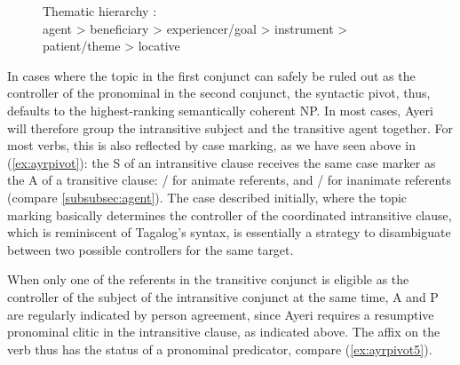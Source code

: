 \begin{figure}[h]
\ex\label{ex:themhier}%
	Thematic hierarchy \citep[329]{bresnan2016}:\medskip \\
	agent > beneficiary > experiencer/goal > instrument > patient/theme >
	locative
\xe
\end{figure}

In cases where the topic in the first conjunct can safely be ruled out as the
controller of the pronominal in the second conjunct, the syntactic pivot, thus,
defaults to the highest-ranking semantically coherent NP. In most cases,
Ayeri will therefore group the intransitive subject and the transitive agent
together. For most verbs, this is also reflected by case marking, as we have
seen above in (\ref{ex:ayrpivot}): the S of an intransitive clause receives the
same case marker as the A of a transitive clause:
/ for animate referents, and
/ for inanimate referents (compare
\autoref{subsubsec:agent}). The case described initially, where the topic
marking basically determines the controller of the coordinated intransitive
clause, which is reminiscent of Tagalog's syntax, is essentially a strategy to
disambiguate between two possible controllers for the same target.

When only one of the referents in the transitive conjunct is eligible as the
controller of the subject of the intransitive conjunct at the same time, A and
P are regularly indicated by person agreement, since Ayeri requires a
resumptive pronominal clitic in the intransitive clause, as indicated above.
The affix on the verb thus has the status of a pronominal predicator, compare 
(\ref{ex:ayrpivot5}).

